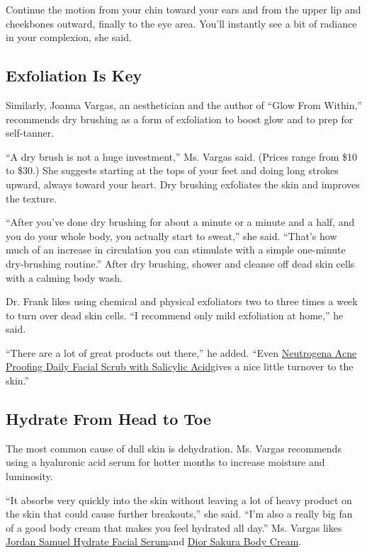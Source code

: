 Continue the motion from your chin toward your ears and from the upper
lip and cheekbones outward, finally to the eye area. You'll instantly
see a bit of radiance in your complexion, she said.

\hypertarget{exfoliation-is-key}{%
\subsection{Exfoliation Is Key}\label{exfoliation-is-key}}

Similarly, Joanna Vargas, an aesthetician and the author of ``Glow From
Within,'' recommends dry brushing as a form of exfoliation to boost glow
and to prep for self-tanner.

``A dry brush is not a huge investment,'' Ms. Vargas said. (Prices range
from \$10 to \$30.) She suggests starting at the tops of your feet and
doing long strokes upward, always toward your heart. Dry brushing
exfoliates the skin and improves the texture.

``After you've done dry brushing for about a minute or a minute and a
half, and you do your whole body, you actually start to sweat,'' she
said. ``That's how much of an increase in circulation you can stimulate
with a simple one-minute dry-brushing routine.'' After dry brushing,
shower and cleanse off dead skin cells with a calming body wash.

Dr. Frank likes using chemical and physical exfoliators two to three
times a week to turn over dead skin cells. ``I recommend only mild
exfoliation at home,'' he said.

``There are a lot of great products out there,'' he added. ``Even
\href{https://www.neutrogena.com/products/skincare/acne-proofing-daily-scrub/6810003.html}{Neutrogena
Acne Proofing Daily Facial Scrub with Salicylic Acid}gives a nice little
turnover to the skin.''

\hypertarget{hydrate-from-head-to-toe}{%
\subsection{Hydrate From Head to Toe}\label{hydrate-from-head-to-toe}}

The most common cause of dull skin is dehydration. Ms. Vargas recommends
using a hyaluronic acid serum for hotter months to increase moisture and
luminosity.

``It absorbs very quickly into the skin without leaving a lot of heavy
product on the skin that could cause further breakouts,'' she said.
``I'm also a really big fan of a good body cream that makes you feel
hydrated all day.'' Ms. Vargas likes
\href{https://jordansamuelskin.com/products/hydrate-facial-serum?variant=32354815934573}{Jordan
Samuel Hydrate Facial Serum}and
\href{https://www.dior.com/en_us/products/beauty-Y0996011-sakura-body-cream}{Dior
Sakura Body Cream}.


